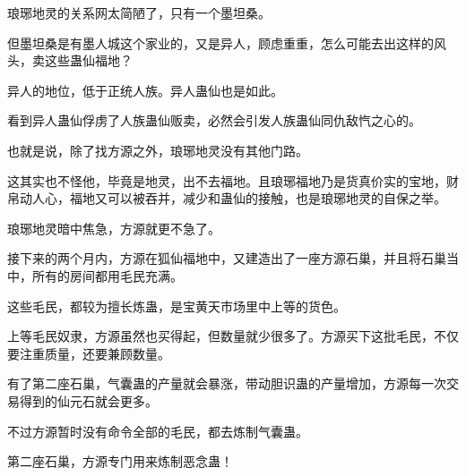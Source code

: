 \begin{this_body}
琅琊地灵的关系网太简陋了，只有一个墨坦桑。

但墨坦桑是有墨人城这个家业的，又是异人，顾虑重重，怎么可能去出这样的风头，卖这些蛊仙福地？

异人的地位，低于正统人族。异人蛊仙也是如此。

看到异人蛊仙俘虏了人族蛊仙贩卖，必然会引发人族蛊仙同仇敌忾之心的。

也就是说，除了找方源之外，琅琊地灵没有其他门路。

这其实也不怪他，毕竟是地灵，出不去福地。且琅琊福地乃是货真价实的宝地，财帛动人心，福地又可以被吞并，减少和蛊仙的接触，也是琅琊地灵的自保之举。

琅琊地灵暗中焦急，方源就更不急了。

接下来的两个月内，方源在狐仙福地中，又建造出了一座方源石巢，并且将石巢当中，所有的房间都用毛民充满。

这些毛民，都较为擅长炼蛊，是宝黄天市场里中上等的货色。

上等毛民奴隶，方源虽然也买得起，但数量就少很多了。方源买下这批毛民，不仅要注重质量，还要兼顾数量。

有了第二座石巢，气囊蛊的产量就会暴涨，带动胆识蛊的产量增加，方源每一次交易得到的仙元石就会更多。

不过方源暂时没有命令全部的毛民，都去炼制气囊蛊。

第二座石巢，方源专门用来炼制恶念蛊！

\end{this_body}

